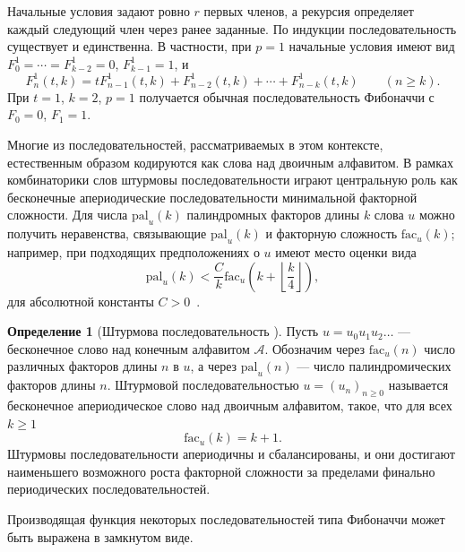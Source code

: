\documentclass[a4paper,14pt]{extreport}
\theoremstyle{plain}
\theoremstyle{definition}
\newtheorem{definition}{Определение}[section]
\theoremstyle{remark}
\begin{document}
Начальные условия задают ровно $r$ первых членов, а рекурсия
определяет каждый следующий член через ранее заданные.
По индукции последовательность существует и единственна.
В частности, при $p=1$ начальные условия имеют вид
$F_0^1=\cdots=F_{k-2}^1=0$, $F_{k-1}^1=1$, и
\[
 F_n^1(t,k)=tF_{n-1}^1(t,k)+F_{n-2}^1(t,k)+\cdots+F_{n-k}^1(t,k)
 \qquad(n\ge k).
\]
При $t=1$, $k=2$, $p=1$ получается обычная последовательность
Фибоначчи с $F_0=0$, $F_1=1$.

Многие из последовательностей, рассматриваемых в этом контексте, естественным образом кодируются как слова над двоичным алфавитом. В рамках комбинаторики слов штурмовы последовательности играют центральную роль как бесконечные апериодические последовательности минимальной факторной сложности. Для числа $\mathrm{pal}_u(k)$ палиндромных факторов длины $k$ слова $u$ можно получить неравенства, связывающие $\mathrm{pal}_u(k)$ и факторную сложность $\mathrm{fac}_u(k)$; например, при подходящих предположениях о $u$ имеют место оценки вида
\begin{equation}
	\mathrm{pal}_u(k) < \frac{C}{k} \mathrm{fac}_u\!\left(k+\left\lfloor\frac{k}{4}\right\rfloor\right),
\end{equation}
для абсолютной константы $C>0$~\cite{AlloucheBaake}.

\begin{definition}[Штурмова последовательность {\cite{AlloucheBaake}}]\label{plann1}
	Пусть $u = u_0u_1u_2\ldots$ --- бесконечное слово над конечным алфавитом $\mathcal{A}$. Обозначим через $\mathrm{fac}_u(n)$ число различных факторов длины $n$ в $u$, а через $\mathrm{pal}_u(n)$ --- число палиндромических факторов длины $n$. Штурмовой последовательностью $u = (u_n)_{n \geq 0}$ называется бесконечное апериодическое слово над двоичным алфавитом, такое, что для всех $k \geq 1$
	\begin{equation}
		\mathrm{fac}_u(k) = k + 1.
	\end{equation}
	Штурмовы последовательности апериодичны и сбалансированы, и они достигают наименьшего возможного роста факторной сложности за пределами финально периодических последовательностей.
\end{definition}

Производящая функция некоторых последовательностей типа Фибоначчи может быть выражена в замкнутом виде.
\end{document}
